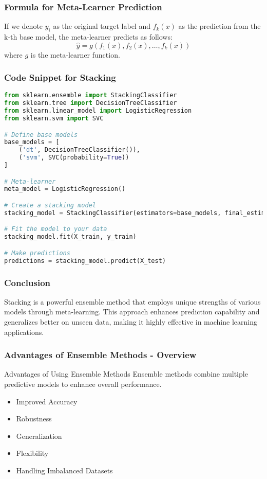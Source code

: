 \documentclass[aspectratio=169]{beamer}
\begin{document}
\begin{frame}[fragile]
    \frametitle{Formula for Meta-Learner Prediction}
    If we denote \(y_i\) as the original target label and \(f_k(x)\) as the prediction from the k-th base model, the meta-learner predicts as follows:
    \begin{equation}
        \hat{y} = g(f_1(x), f_2(x), \ldots, f_k(x))
    \end{equation}
    where \(g\) is the meta-learner function.
\end{frame}

\begin{frame}[fragile]
    \frametitle{Code Snippet for Stacking}
    \begin{lstlisting}[language=Python]
from sklearn.ensemble import StackingClassifier
from sklearn.tree import DecisionTreeClassifier
from sklearn.linear_model import LogisticRegression
from sklearn.svm import SVC

# Define base models
base_models = [
    ('dt', DecisionTreeClassifier()),
    ('svm', SVC(probability=True))
]

# Meta-learner
meta_model = LogisticRegression()

# Create a stacking model
stacking_model = StackingClassifier(estimators=base_models, final_estimator=meta_model)

# Fit the model to your data
stacking_model.fit(X_train, y_train)

# Make predictions
predictions = stacking_model.predict(X_test)
    \end{lstlisting}
\end{frame}

\begin{frame}[fragile]
    \frametitle{Conclusion}
    Stacking is a powerful ensemble method that employs unique strengths of various models through meta-learning. This approach enhances prediction capability and generalizes better on unseen data, making it highly effective in machine learning applications.
\end{frame}

\begin{frame}[fragile]
    \frametitle{Advantages of Ensemble Methods - Overview}
    \begin{block}{Advantages of Using Ensemble Methods}
        Ensemble methods combine multiple predictive models to enhance overall performance.
    \end{block}
    
    \begin{itemize}
        \item Improved Accuracy
        \item Robustness
        \item Generalization
        \item Flexibility
        \item Handling Imbalanced Datasets
    \end{itemize}
\end{frame}
\end{document}
